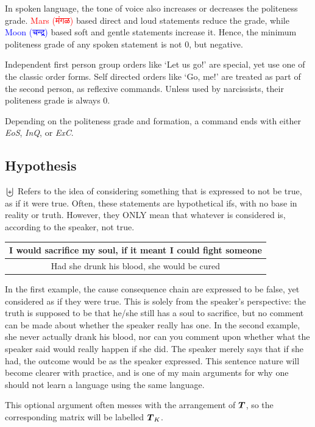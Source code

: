 In spoken language,  the tone of voice also increases or decreases the politeness grade. \textcolor{red}{Mars (\textsanskrit{मंगळ})} based direct and loud statements reduce the grade, while \textcolor{blue}{Moon (\textsanskrit{चन्द्र})} based soft and gentle statements increase it. Hence, the minimum politeness grade of any spoken statement is not $0$, but negative.

Independent first person group orders like `Let us go!' are special, yet use one of the classic order forms. Self directed orders like `Go, me!' are treated as part of the second person, as  reflexive commands. Unless used by narcissists, their politeness grade is always $0$.

Depending on the politeness grade and formation, a command ends with either \textit{EoS}, \textit{InQ}, or \textit{ExC}.
\subsection{Hypothesis}
$\biguplus$ Refers to the idea of considering something that is expressed to not be true, as if it were true. Often, these statements are  hypothetical ifs, with no base in reality or truth. However, they ONLY mean that whatever is considered is, according to the speaker, not true.
\begin{example}
    \begin{tabular}{c}
    I would sacrifice my soul, if it meant I could fight someone\\\hline
    Had she drunk his blood, she would be cured
    \end{tabular}
\end{example}
In the first example, the cause consequence chain are expressed to be false, yet considered as if they were true. This is solely from the speaker's perspective: the truth is supposed to be that he/she still has a soul to sacrifice, but no comment can be made about whether the speaker really has one. In the second example, she never actually drank his blood, nor can you comment upon whether what the speaker said would really happen if she did. The speaker merely says that if she had, the outcome would be as the speaker expressed. This sentence nature will become clearer with practice, and is one of my  main arguments for why one should not learn a language using the same language.

This optional argument often messes with the arrangement of $\boldsymbol{T}$, so the corresponding matrix will be labelled $\boldsymbol{T}_K$.
